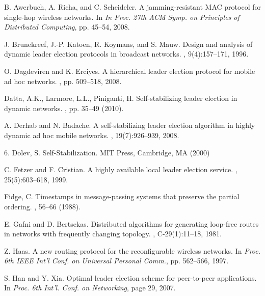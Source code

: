 \begin{thebibliography}{1}
	
	B. Awerbuch, A. Richa, and C. Scheideler.
	\newblock A jamming-resistant MAC protocol for single-hop wireless networks.
	\newblock In {\em In Proc. 27th ACM Symp. on Principles of Distributed Computing}, pp. 45–54, 2008.
	
	
	J. Brunekreef, J.-P. Katoen, R. Koymans, and S. Mauw.
	\newblock Design and analysis of dynamic leader election protocols in broadcast networks.
	, 9(4):157–171, 1996.
	
	O. Dagdeviren and K. Erciyes.
	\newblock A hierarchical leader election protocol for mobile ad hoc networks.
	, pp. 509–518, 2008.
	
	Datta, A.K., Larmore, L.L., Piniganti, H.
	\newblock Self-stabilizing leader election in dynamic networks.
	, pp. 35–49 (2010).
	
	A. Derhab and N. Badache.
	\newblock A self-stabilizing leader election algorithm in highly dynamic ad hoc mobile networks.
	, 19(7):926–939, 2008.
	
	6. Dolev, S.
	\newblock Self-Stabilization. MIT Press, Cambridge, MA (2000)
	
	C. Fetzer and F. Cristian.
	\newblock A highly available local leader election service.
	, 25(5):603–618, 1999.
	
	Fidge, C.
	\newblock Timestamps in message-passing systems that preserve the partial ordering.
	, 56–66 (1988).
	
	E. Gafni and D. Bertsekas.
	\newblock Distributed algorithms for generating loop-free routes in networks with frequently changing topology.
	, C-29(1):11–18, 1981.
	
	Z. Haas.
	\newblock  A new routing protocol for the reconfigurable wireless networks.
	\newblock In {\em Proc. 6th IEEE Int’l Conf. on Universal Personal Comm.}, pp. 562–566, 1997.
	
	S. Han and Y. Xia.
	\newblock  Optimal leader election scheme for peer-to-peer applications.
	\newblock In {\em Proc. 6th Int’l. Conf. on Networking}, page 29, 2007.
	

\end{thebibliography}
